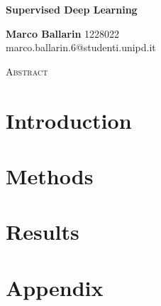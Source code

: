 \documentclass{article}
\begin{document}
\begin{center}
    \huge
    \textbf{Supervised Deep Learning}  %
    
    \normalsize
    \vspace{0.4cm}
    \textbf{Marco Ballarin} 1228022  \\ %
    marco.ballarin.6@studenti.unipd.it

    \vspace{0.5cm}
    \Large
    \textsc{ Abstract}
    \begin{adjustwidth}{30pt}{30pt}
    \normalsize
    \vspace{0.3cm}
    
    \end{adjustwidth}
\end{center}
\vspace{0.2cm}


\section{Introduction \label{sec:int}}


\section{Methods \label{sec:meth}}


\section{Results \label{sec:res}}


\section{Appendix \label{sec:app}}



\end{document}
